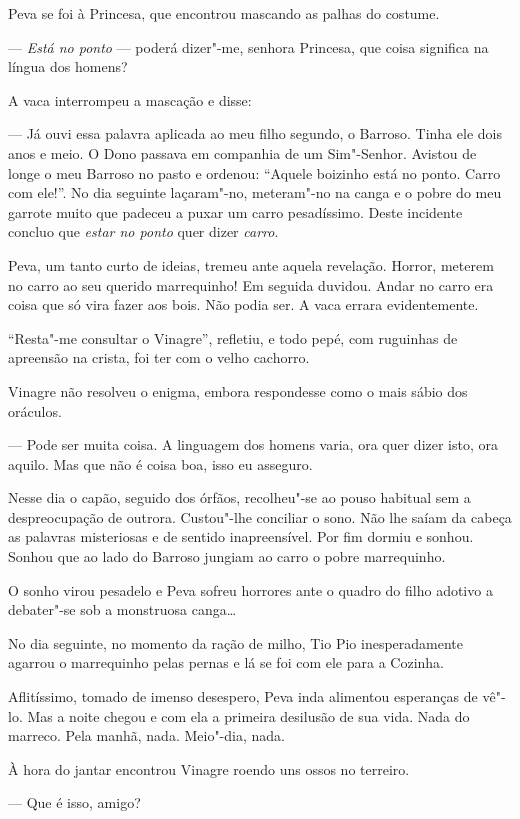 Peva se foi à Princesa, que encontrou mascando as palhas do costume.

--- \emph{Está no ponto} --- poderá dizer"-me, senhora Princesa, que
coisa significa na língua dos homens?

A vaca interrompeu a mascação e disse:

--- Já ouvi essa palavra aplicada ao meu filho segundo, o Barroso. Tinha
ele dois anos e meio. O Dono passava em companhia de um Sim"-Senhor.
Avistou de longe o meu Barroso no pasto e ordenou: ``Aquele boizinho
está no ponto. Carro com ele!''. No dia seguinte laçaram"-no, meteram"-no
na canga e o pobre do meu garrote muito que padeceu a puxar um carro
pesadíssimo. Deste incidente concluo que \emph{estar no ponto} quer
dizer \emph{carro}.

Peva, um tanto curto de ideias, tremeu ante aquela revelação. Horror,
meterem no carro ao seu querido marrequinho! Em seguida duvidou. Andar
no carro era coisa que só vira fazer aos bois. Não podia ser. A vaca
errara evidentemente.

``Resta"-me consultar o Vinagre'', refletiu, e todo pepé, com ruguinhas
de apreensão na crista, foi ter com o velho cachorro.

Vinagre não resolveu o enigma, embora respondesse como o mais sábio dos
oráculos.

--- Pode ser muita coisa. A linguagem dos homens varia, ora quer dizer
isto, ora aquilo. Mas que não é coisa boa, isso eu asseguro.

Nesse dia o capão, seguido dos órfãos, recolheu"-se ao pouso habitual sem
a despreocupação de outrora. Custou"-lhe conciliar o sono. Não lhe saíam
da cabeça as palavras misteriosas e de sentido inapreensível. Por fim
dormiu e sonhou. Sonhou que ao lado do Barroso jungiam ao carro o pobre
marrequinho.

O sonho virou pesadelo e Peva sofreu horrores ante o quadro do filho
adotivo a debater"-se sob a monstruosa canga\ldots{}

No dia seguinte, no momento da ração de milho, Tio Pio inesperadamente
agarrou o marrequinho pelas pernas e lá se foi com ele para a Cozinha.

Aflitíssimo, tomado de imenso desespero, Peva inda alimentou esperanças
de vê"-lo. Mas a noite chegou e com ela a primeira desilusão de sua vida.
Nada do marreco. Pela manhã, nada. Meio"-dia, nada.

À hora do jantar encontrou Vinagre roendo uns ossos no terreiro.

--- Que é isso, amigo?

